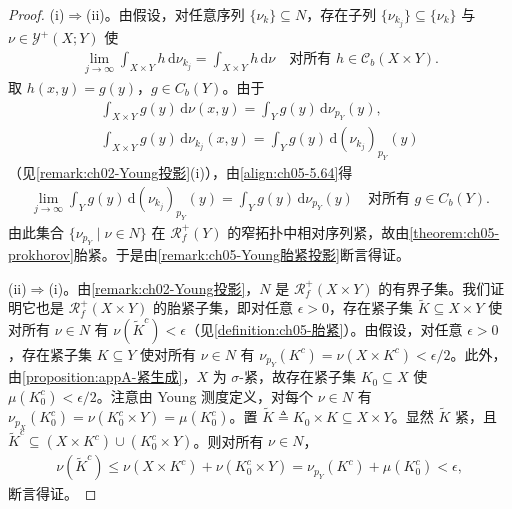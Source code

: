 \documentclass[../../main.tex]{subfiles}%
\begin{document}
\begin{proof}
(i)$\Rightarrow$(ii)。由假设，对任意序列 $\{\nu_k\}\subseteq N$，存在子列 $\{\nu_{k_j}\}\subseteq\{\nu_k\}$ 与 $\nu\in\mathcal{Y}^+(X;Y)$ 使
\begin{align}
\lim_{j\to\infty}\int_{X\times Y}h\,\mathrm{d}\nu_{k_j}
=\int_{X\times Y}h\,\mathrm{d}\nu
\quad\text{对所有 }h\in\mathcal{C}_b(X\times Y).\label{align:ch05-5.64}
\end{align}
取 $h(x,y)=g(y)$，$g\in C_b(Y)$。由于
\begin{align*}
\int_{X\times Y}g(y)\,\mathrm{d}\nu(x,y)=\int_Y g(y)\,\mathrm{d}\nu_{p_Y}(y),\\
\int_{X\times Y}g(y)\,\mathrm{d}\nu_{k_j}(x,y)=\int_Y g(y)\,\mathrm{d}(\nu_{k_j})_{p_Y}(y)
\end{align*}
（见\cref{remark:ch02-Young投影}(i)），由\eqref{align:ch05-5.64}得
\begin{align*}
\lim_{j\to\infty}\int_Y g(y)\,\mathrm{d}(\nu_{k_j})_{p_Y}(y)
=\int_Y g(y)\,\mathrm{d}\nu_{p_Y}(y)
\quad\text{对所有 }g\in C_b(Y).
\end{align*}
由此集合 $\{\nu_{p_Y}\mid\nu\in N\}$ 在 $\mathscr{R}^+_f(Y)$ 的窄拓扑中相对序列紧，故由\cref{theorem:ch05-prokhorov}胎紧。于是由\cref{remark:ch05-Young胎紧投影}断言得证。

(ii)$\Rightarrow$(i)。由\cref{remark:ch02-Young投影}，$N$ 是 $\mathscr{R}^+_f(X\times Y)$ 的有界子集。我们证明它也是 $\mathscr{R}^+_f(X\times Y)$ 的胎紧子集，即对任意 $\epsilon>0$，存在紧子集 $\tilde{K}\subseteq X\times Y$ 使对所有 $\nu\in N$ 有 $\nu(\tilde{K}^c)<\epsilon$（见\cref{definition:ch05-胎紧}）。由假设，对任意 $\epsilon>0$，存在紧子集 $K\subseteq Y$ 使对所有 $\nu\in N$ 有 $\nu_{p_Y}(K^c)=\nu(X\times K^c)<\epsilon/2$。此外，由\cref{proposition:appA-紧生成}，$X$ 为 $\sigma$-紧，故存在紧子集 $K_0\subseteq X$ 使 $\mu(K_0^c)<\epsilon/2$。注意由 Young 测度定义，对每个 $\nu\in N$ 有 $\nu_{p_X}(K_0^c)=\nu(K_0^c\times Y)=\mu(K_0^c)$。置 $\tilde{K}\triangleq K_0\times K\subseteq X\times Y$。显然 $\tilde{K}$ 紧，且 $\tilde{K}^c\subseteq(X\times K^c)\cup(K_0^c\times Y)$。则对所有 $\nu\in N$，
\begin{align*}
\nu(\tilde{K}^c)\leqslant\nu(X\times K^c)+\nu(K_0^c\times Y)
=\nu_{p_Y}(K^c)+\mu(K_0^c)<\epsilon,
\end{align*}
断言得证。


\end{proof}
\end{document}
